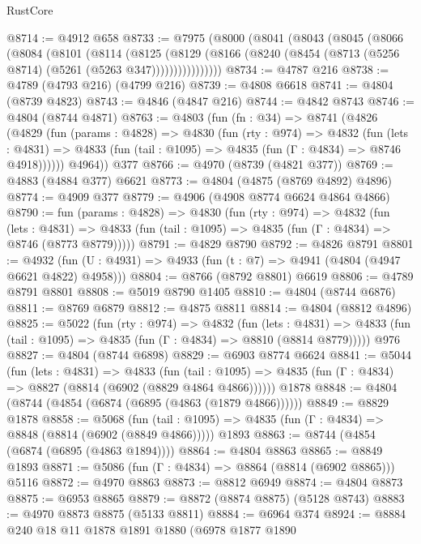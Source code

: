 \begin{lexlean}{RustCore}
\begin{coremodule}
@8714 := @4912 @658
@8733 := @7975
    (@8000
      (@8041
        (@8043
          (@8045
            (@8066
              (@8084
                (@8101
                  (@8114
                    (@8125
                      (@8129
                        (@8166 (@8240 (@8454 (@8713 (@5256 @8714) (@5261 (@5263 @347))))))))))))))))
@8734 := @4787 @216
@8738 := @4789 (@4793 @216) (@4799 @216)
@8739 := @4808 @6618
@8741 := @4804 (@8739 @4823)
@8743 := @4846 (@4847 @216)
@8744 := @4842 @8743
@8746 := @4804 (@8744 @4871)
@8763 := @4803
    (fun (fn : @34) =>
    @8741
      (@4826
        (@4829
          (fun (params : @4828) =>
          @4830
            (fun (rty : @974) =>
            @4832
              (fun (lets : @4831) =>
              @4833 (fun (tail : @1095) => @4835 (fun (Γ : @4834) => @8746 @4918))))))
        @4964))
    @377
@8766 := @4970 (@8739 (@4821 @377))
@8769 := @4883 (@4884 @377) @6621
@8773 := @4804 (@4875 (@8769 @4892) @4896)
@8774 := @4909 @377
@8779 := @4906 (@4908 @8774 @6624 @4864 @4866)
@8790 := fun (params : @4828) =>
  @4830
    (fun (rty : @974) =>
    @4832
      (fun (lets : @4831) =>
      @4833 (fun (tail : @1095) => @4835 (fun (Γ : @4834) => @8746 (@8773 @8779)))))
@8791 := @4829 @8790
@8792 := @4826 @8791
@8801 := @4932 (fun (U : @4931) => @4933 (fun (t : @7) => @4941 (@4804 (@4947 @6621 @4822) @4958)))
@8804 := @8766 (@8792 @8801) @6619
@8806 := @4789 @8791 @8801
@8808 := @5019 @8790 @1405
@8810 := @4804 (@8744 @6876)
@8811 := @8769 @6879
@8812 := @4875 @8811
@8814 := @4804 (@8812 @4896)
@8825 := @5022
    (fun (rty : @974) =>
    @4832
      (fun (lets : @4831) =>
      @4833 (fun (tail : @1095) => @4835 (fun (Γ : @4834) => @8810 (@8814 @8779)))))
    @976
@8827 := @4804 (@8744 @6898)
@8829 := @6903 @8774 @6624
@8841 := @5044
    (fun (lets : @4831) =>
    @4833
      (fun (tail : @1095) => @4835 (fun (Γ : @4834) => @8827 (@8814 (@6902 (@8829 @4864 @4866))))))
    @1878
@8848 := @4804 (@8744 (@4854 (@6874 (@6895 (@4863 (@1879 @4866))))))
@8849 := @8829 @1878
@8858 := @5068
    (fun (tail : @1095) => @4835 (fun (Γ : @4834) => @8848 (@8814 (@6902 (@8849 @4866)))))
    @1893
@8863 := @8744 (@4854 (@6874 (@6895 (@4863 @1894))))
@8864 := @4804 @8863
@8865 := @8849 @1893
@8871 := @5086 (fun (Γ : @4834) => @8864 (@8814 (@6902 @8865))) @5116
@8872 := @4970 @8863
@8873 := @8812 @6949
@8874 := @4804 @8873
@8875 := @6953 @8865
@8879 := @8872 (@8874 @8875) (@5128 @8743)
@8883 := @4970 @8873 @8875 (@5133 @8811)
@8884 := @6964 @374
@8924 := @8884
    @240
    @18
    @11
    @1878
    @1891
    @1880
    (@6978
      @1877
      @1890

\end{coremodule}
\end{lexlean}
